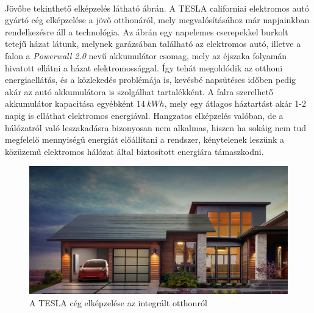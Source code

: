 \paragraph{}
Jövőbe tekinthető elképzelés látható  ábrán. A TESLA californiai elektromos autó gyártó cég elképzelése a jövő otthonáról, mely megvalósításához már napjainkban rendelkezésre áll a technológia. Az ábrán egy napelemes cserepekkel burkolt tetejű házat látunk, melynek garázsában található az elektromos autó, illetve a falon a \emph{Powerwall 2.0} nevű akkumulátor csomag, mely az éjszaka folyamán hivatott ellátni a házat elektromossággal. Így tehát megoldódik az otthoni energiaellátás, és a közlekedés problémája is, kevésbé napsütéses időben pedig akár az autó akkumulátora is szolgálhat tartalékként. A falra szerelhető akkumulátor kapacitása egyébként $14\ kWh$, mely egy átlagos háztartást akár 1-2 napig is elláthat elektromos energiával. Hangzatos elképzelés valóban, de a hálózatról való leszakadásra bizonyosan nem alkalmas, hiszen ha sokáig nem tud megfelelő mennyiségű energiát előállítani a rendszer, kénytelenek leszünk a közüzemű elektromos hálózat által biztosított energiára támaszkodni.

\begin{figure}[h]
	\centering
	\includegraphics[width = \textwidth]{figures/section-solar.jpg}
	\caption{A TESLA cég elképzelése az integrált otthonról} 
	\label{fig:tesla_home}
\end{figure}



